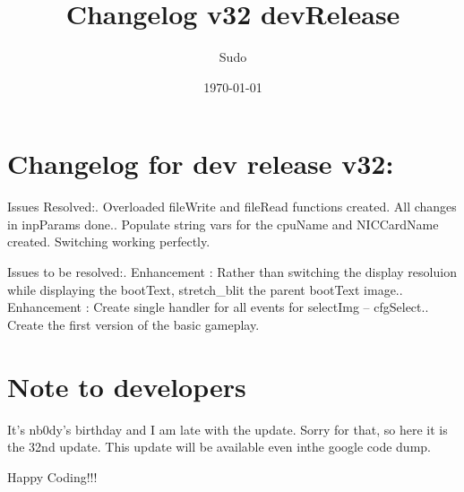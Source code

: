 \documentclass[a4paper]{article}
\begin{document}
\title{Changelog v32 devRelease}	%
\author{Sudo}	%
\date{\today}
\maketitle

\section{Changelog for dev release v32:}
Issues Resolved:. Overloaded fileWrite and fileRead functions created. All changes in inpParams done.. Populate string vars for the cpuName and NICCardName created. Switching working perfectly.\newline

Issues to be resolved:. Enhancement : Rather than switching the display resoluion while displaying the bootText, stretch\_blit the parent bootText image.. Enhancement : Create single handler for all events for selectImg -- cfgSelect.. Create the first version of the basic gameplay.\newline

\section{Note to developers}
It's nb0dy's birthday and I am late with the update. Sorry for that, so here it is the 32nd update. This update will be available even inthe google code dump.\newline

Happy Coding!!!\newline

\pagebreak
\end{document}
